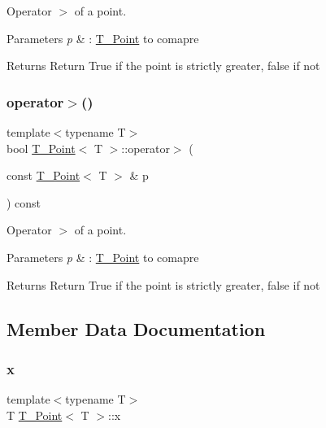 Operator $>$ of a point. 


\begin{DoxyParams}{Parameters}
{\em p} & \+: \hyperlink{classT__Point}{T\+\_\+\+Point} to comapre \\
\hline
\end{DoxyParams}
\begin{DoxyReturn}{Returns}
Return True if the point is strictly greater, false if not 
\end{DoxyReturn}
\mbox{\label{classT__Point_a0a9956de8ab7c8dccf35b78c43aedefd}} 
\subsubsection{\texorpdfstring{operator$>$()}{operator>()}\hspace{0.1cm}{\footnotesize\ttfamily [2/2]}}
{\footnotesize\ttfamily template$<$typename T$>$ \\
bool \hyperlink{classT__Point}{T\+\_\+\+Point}$<$ T $>$\+::operator$>$ (\begin{DoxyParamCaption}\item[{const \hyperlink{classT__Point}{T\+\_\+\+Point}$<$ T $>$ \&}]{p }\end{DoxyParamCaption}) const\hspace{0.3cm}{\ttfamily [inline]}}



Operator $>$ of a point. 


\begin{DoxyParams}{Parameters}
{\em p} & \+: \hyperlink{classT__Point}{T\+\_\+\+Point} to comapre \\
\hline
\end{DoxyParams}
\begin{DoxyReturn}{Returns}
Return True if the point is strictly greater, false if not 
\end{DoxyReturn}


\subsection{Member Data Documentation}
\mbox{\label{classT__Point_a45cc1c670a8d9bc786a38428cdce4bd2}} 
\subsubsection{\texorpdfstring{x}{x}}
{\footnotesize\ttfamily template$<$typename T$>$ \\
T \hyperlink{classT__Point}{T\+\_\+\+Point}$<$ T $>$\+::x}

